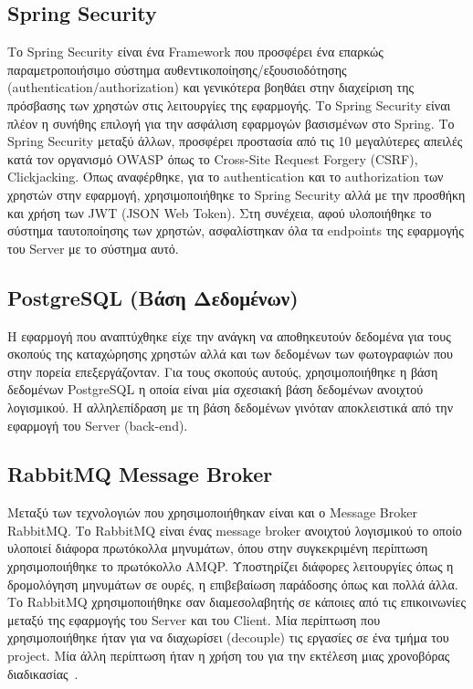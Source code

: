 \documentclass[oneside, 12pt]{book}
\begin{document}
\subsection{Spring Security}
Το Spring Security είναι ένα Framework που προσφέρει ένα επαρκώς 
παραμετροποιήσιμο σύστημα αυθεντικοποίησης/εξουσιοδότησης 
(authentication/authorization) και γενικότερα βοηθάει στην διαχείριση 
της πρόσβασης των χρηστών στις λειτουργίες της εφαρμογής. Το Spring 
Security είναι πλέον η συνήθης επιλογή για την ασφάλιση εφαρμογών 
βασισμένων στο Spring. Το Spring Security μεταξύ άλλων, προσφέρει 
προστασία από τις 10 μεγαλύτερες απειλές κατά τον οργανισμό OWASP όπως 
το Cross-Site Request Forgery (CSRF), Clickjacking.
\cite{spring_security}
Όπως αναφέρθηκε, για το authentication και το authorization των χρηστών στην εφαρμογή, χρησιμοποιήθηκε το Spring Security αλλά με την προσθήκη και χρήση των JWT (JSON Web Token). Στη συνέχεια, αφού υλοποιήθηκε το σύστημα ταυτοποίησης των χρηστών, ασφαλίστηκαν όλα τα endpoints της εφαρμογής του Server με το σύστημα αυτό.

\subsection{PostgreSQL (Βάση Δεδομένων)} Η εφαρμογή που αναπτύχθηκε είχε 
την ανάγκη να αποθηκευτούν δεδομένα για τους σκοπούς της καταχώρησης 
χρηστών αλλά και των δεδομένων των φωτογραφιών που στην πορεία 
επεξεργάζονταν. Για τους σκοπούς αυτούς, χρησιμοποιήθηκε η βάση 
δεδομένων PostgreSQL η οποία είναι μία σχεσιακή βάση δεδομένων 
ανοιχτού λογισμικού. Η αλληλεπίδραση με τη βάση δεδομένων γινόταν 
αποκλειστικά από την εφαρμογή του Server (back-end).

\subsection{RabbitMQ Message Broker} Μεταξύ των τεχνολογιών που 
χρησιμοποιήθηκαν είναι και ο Message Broker RabbitMQ. Το RabbitMQ είναι ένας 
message broker ανοιχτού λογισμικού το οποίο υλοποιεί διάφορα πρωτόκολλα μηνυμάτων, 
όπου στην συγκεκριμένη περίπτωση χρησιμοποιήθηκε το πρωτόκολλο AMQP. Υποστηρίζει 
διάφορες λειτουργίες όπως η δρομολόγηση μηνυμάτων σε ουρές, η επιβεβαίωση παράδοσης 
όπως και πολλά άλλα. Το RabbitMQ χρησιμοποιήθηκε σαν διαμεσολαβητής σε κάποιες από 
τις επικοινωνίες μεταξύ της εφαρμογής του Server και του Client. Μία περίπτωση που 
χρησιμοποιήθηκε ήταν για να διαχωρίσει (decouple) τις εργασίες σε ένα τμήμα του 
project. Μία άλλη περίπτωση ήταν η χρήση του για την εκτέλεση μιας χρονοβόρας 
διαδικασίας~\cite{rabbitmq_features}.
\end{document}

